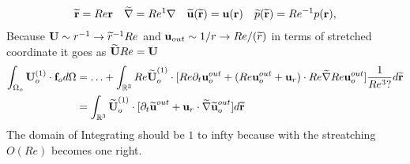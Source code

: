 \begin{align}
    \wt{\textbf{r}} = Re \textbf{r}
    && \wt{\grad} = Re^{1} \grad
    && \wt{\textbf{u}}(\wt{\textbf{r}}) = \textbf{u}(\textbf{r})
    && \wt{p}(\wt{\textbf{r}}) = Re^{-1} p(\textbf{r}),
\end{align}
Because $\textbf{U}\sim r^{-1} \to \wt{r}^{-1} Re $ and $\textbf{u}_{out} \sim 1/r \to Re/(\wt{r} )$ in terms of stretched coordinate it goes as $\wt{\textbf{U}} Re = \textbf{U}$
\begin{align}
    \intO[o]{\textbf{U}_{o}^{(1)}\cdot \textbf{f}_{o}}
    &=
    \ldots +  \int_{\mathbb{R}^3}Re \wt{\textbf{U}}_{o}^{(1)}\cdot [Re\pddt \textbf{u}_o^{out}+  (Re \textbf{u}_{o}^{out}+\textbf{u}_r)\cdot Re \wt{\grad}  Re\textbf{u}_{o}^{out} ]\frac{1}{Re^3 ? } d\wt{\textbf{r}}\\
    &=\int_{\mathbb{R}^3} \wt{\textbf{U}}_{o}^{(1)}\cdot  [\pddt \wt{\textbf{u}}^{out}+ \textbf{u}_r \cdot  \wt{\grad}  \wt{\textbf{u}}_{o}^{out}] d\wt{\textbf{r}}
\end{align}
The domain of Integrating should be $1$ to infty because with the streatching $O(Re)$ becomes one right.


